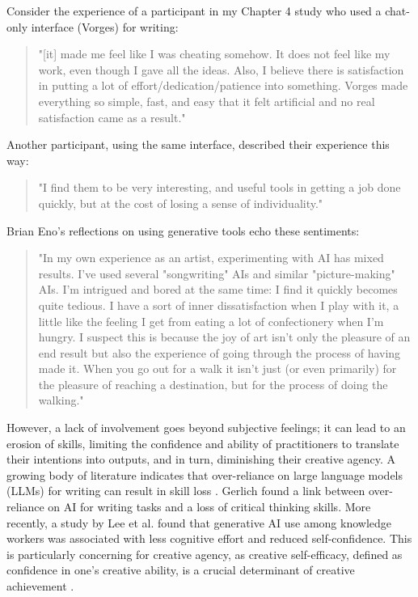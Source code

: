Consider the experience of a participant in my Chapter 4 study who used a chat-only interface (Vorges) for writing:

\begin{quote}
"[it] made me feel like I was cheating somehow. It does not feel like my work, even though I gave all the ideas. Also, I believe there is satisfaction in putting a lot of effort/dedication/patience into something. Vorges made everything so simple, fast, and easy that it felt artificial and no real satisfaction came as a result."
\end{quote}

Another participant, using the same interface, described their experience this way:

\begin{quote}
"I find them to be very interesting, and useful tools in getting a job done quickly, but at the cost of losing a sense of individuality."
\end{quote}

Brian Eno's reflections on using generative tools echo these sentiments:

\begin{quote}
"In my own experience as an artist, experimenting with AI has mixed results. I've used several "songwriting" AIs and similar "picture-making" AIs. I'm intrigued and bored at the same time: I find it quickly becomes quite tedious. I have a sort of inner dissatisfaction when I play with it, a little like the feeling I get from eating a lot of confectionery when I'm hungry. I suspect this is because the joy of art isn't only the pleasure of an end result but also the experience of going through the process of having made it. When you go out for a walk it isn't just (or even primarily) for the pleasure of reaching a destination, but for the process of doing the walking." \cite{Eno2024-rj}
\end{quote}

However, a lack of involvement goes beyond subjective feelings; it can lead to an erosion of skills, limiting the confidence and ability of practitioners to translate their intentions into outputs, and in turn, diminishing their creative agency. A growing body of literature indicates that over-reliance on large language models (LLMs) for writing can result in skill loss \cite{Heersmink2024-mk, Rafner2021-tm}. Gerlich \cite{Gerlich2025-as} found a link between over-reliance on AI for writing tasks and a loss of critical thinking skills. More recently, a study by Lee et al. \cite{Lee2025-dw} found that generative AI use among knowledge workers was associated with less cognitive effort and reduced self-confidence. This is particularly concerning for creative agency, as creative self-efficacy, defined as confidence in one's creative ability, is a crucial determinant of creative achievement \cite{Tierney2002-xp}.

